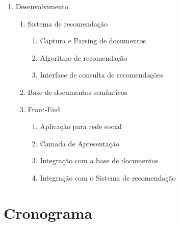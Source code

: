 \documentclass[]{article}
\begin{document}
\begin{enumerate}
	\item Desenvolvimento
	\begin{enumerate}
		\item Sistema de recomendação
		\begin{enumerate}
			\item Captura e Parsing de documentos
			\item Algoritmo de recomendação
			\item Interface de consulta de recomendações
		\end{enumerate}
		\item Base de documentos semânticos
		\item Front-End
		\begin{enumerate}
			\item Aplicação para rede social
			\item Camada de Apresentação
			\item Integração com a base de documentos
			\item Integração com o Sistema de recomendação
		\end{enumerate}
	\end{enumerate}
	
\end{enumerate}



\section{Cronograma} %
\label{sec:cronograma}
\end{document}
